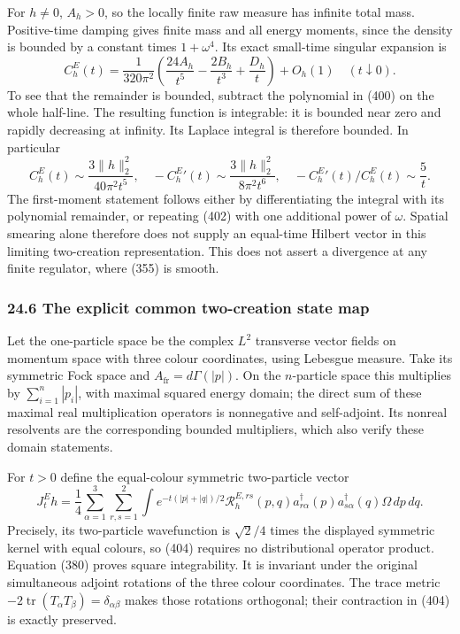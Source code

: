 \documentclass[
  11pt,
]{article}
\begin{document}
For \(h\ne0\), \(A_h>0\), so the locally finite raw measure has infinite
total mass. Positive-time damping gives finite mass and all energy
moments, since the density is bounded by a constant times
\(1+\omega^4\). Its exact small-time singular expansion is \[
 C^E_h(t)=\frac1{320\pi^2}
    \left(\frac{24A_h}{t^5}-\frac{2B_h}{t^3}
                          +\frac{D_h}{t}\right)+O_h(1)
 \quad(t\downarrow0).
 \tag{402}
\] To see that the remainder is bounded, subtract the polynomial in
(400) on the whole half-line. The resulting function is integrable: it
is bounded near zero and rapidly decreasing at infinity. Its Laplace
integral is therefore bounded. In particular \[
 C^E_h(t)\sim\frac{3\|h\|_2^2}{40\pi^2t^5},\quad
 -{C^E_h}'(t)\sim\frac{3\|h\|_2^2}{8\pi^2t^6},\quad
 -{C^E_h}'(t)/C^E_h(t)\sim\frac5t.
 \tag{403}
\] The first-moment statement follows either by differentiating the
integral with its polynomial remainder, or repeating (402) with one
additional power of \(\omega\). Spatial smearing alone therefore does
not supply an equal-time Hilbert vector in this limiting two-creation
representation. This does not assert a divergence at any finite
regulator, where (355) is smooth.

\subsubsection{24.6 The explicit common two-creation state
map}\label{the-explicit-common-two-creation-state-map}

Let the one-particle space be the complex \(L^2\) transverse vector
fields on momentum space with three colour coordinates, using Lebesgue
measure. Take its symmetric Fock space and
\(A_{\mathrm{fr}}=d\Gamma(|p|)\). On the \(n\)-particle space this
multiplies by \(\sum_{i=1}^n|p_i|\), with maximal squared energy domain;
the direct sum of these maximal real multiplication operators is
nonnegative and self-adjoint. Its nonreal resolvents are the
corresponding bounded multipliers, which also verify these domain
statements.

For \(t>0\) define the equal-colour symmetric two-particle vector \[
 J^E_t h=\frac14\sum_{\alpha=1}^3\sum_{r,s=1}^2
 \int e^{-t(|p|+|q|)/2}\mathcal R^{E,rs}_h(p,q)
       a^\dagger_{r\alpha}(p)a^\dagger_{s\alpha}(q)
                       \Omega\,dp\,dq.
 \tag{404}
\] Precisely, its two-particle wavefunction is \(\sqrt2/4\) times the
displayed symmetric kernel with equal colours, so (404) requires no
distributional operator product. Equation (380) proves square
integrability. It is invariant under the original simultaneous adjoint
rotations of the three colour coordinates. The trace metric
\(-2\operatorname{tr}(T_\alpha T_\beta)=\delta_{\alpha\beta}\) makes
those rotations orthogonal; their contraction in (404) is exactly
preserved.
\end{document}
